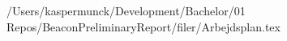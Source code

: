 
\raggedbottom





\tableofcontents


/Users/kaspermunck/Development/Bachelor/01 Repos/BeaconPreliminaryReport/filer/Arbejdsplan.tex


